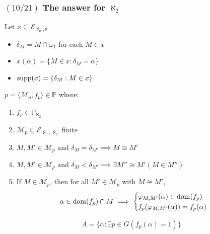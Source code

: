 \documentclass{beamer}
\newcommand{\dom}[1]{{\rm{dom}}(#1)}
\newcommand{\p}{\mathds{P}}
\newcommand{\op}[2]{\langle #1, #2 \rangle}
\newcommand{\supp}[1]{{\rm{supp}}(#1)}
\newcommand{\el}[1]{\mathcal{E}_{\aleph_0, #1}}
\begin{document}
\begin{frame}
\frametitle{$(10/21)$ \hspace{20mm} The answer for $\aleph_2$}
\begin{alertblock}{}
Let $x \subseteq \el{\theta}$
\begin{itemize}
\item $\delta_M=M \cap \omega_1$ for each $M \in x$
\item $x(\alpha)=\lbrace M \in x \colon \delta_M=\alpha \rbrace$
\item  $\supp{x}=\lbrace \delta_M : M \in x \rbrace$
\end{itemize}
\end{alertblock}
\pause
$p =\op{\mathcal{M}_p}{f_p} \in \p$  where:
\begin{enumerate}
\item  $f_p \in \p_{\aleph_2}$
\item $\mathcal{M}_p \subseteq \el{\aleph_2}$ finite
\item $M, M' \in \mathcal{M}_p \text{ and } \delta_M=\delta_{M'} \implies M \cong M'$
\item $M, M' \in \mathcal{M}_p \text{ and } \delta_M<\delta_{M'} \implies \exists M''\cong M'(M \in M'')$
\item If $M \in \mathcal{M}_p$, then for all $M'\in\mathcal{M}_p$ with $M \cong M'$,
\[
\alpha \in \dom{f_p} \cap M \implies
\begin{cases}
 \varphi_{M, M'}(\alpha) \in \dom{f_p}\\
 f_p(\varphi_{M, M'}(\alpha))=f_p(\alpha)
\end{cases}
\]
\end{enumerate}
\pause
\vspace{-4mm}
\begin{alertblock}{}
$$A=\lbrace \alpha \colon \exists p \in G (f_p(\alpha)=1)\rbrace$$
\end{alertblock}
\end{frame}
\end{document}
